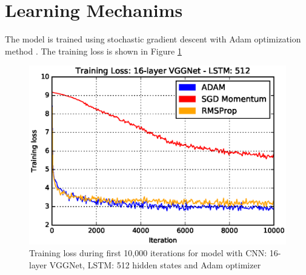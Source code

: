 \section{Learning Mechanims}
The model is trained using stochastic gradient descent with Adam optimization method \cite{DBLP:journals/corr/KingmaB14}. The training loss is shown in Figure \ref{fig:vgg_adam}

\begin{figure}
  \label{fig:vgg_adam}
  \centering
  \includegraphics[width=0.8\linewidth]{Chapters/Fig/vgg_adam_sgdmom_rmsprop_512_graph.eps}
  \caption{Training loss during first 10,000 iterations for model with CNN: 16-layer VGGNet, LSTM: 512 hidden states and Adam optimizer}
\end{figure}

\nocite{MLOxford}